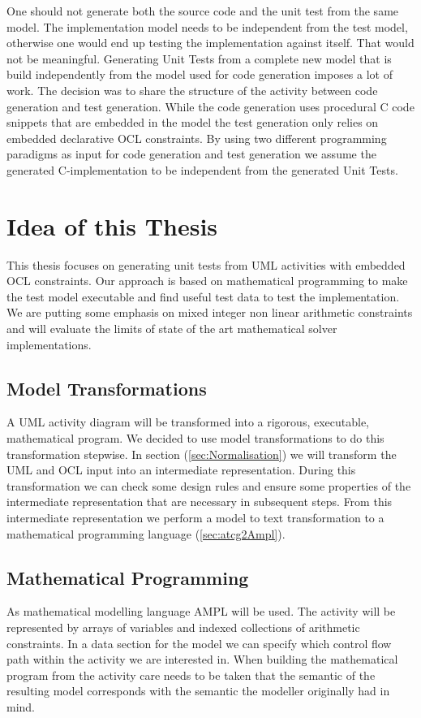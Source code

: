 One should not generate both the source code and the unit test from the same model. The implementation model needs to be independent from the test model, otherwise one would end up testing the implementation against itself. That would not be meaningful. %
Generating Unit Tests from a complete new model that is build independently from the model used for code generation imposes a lot of work. The decision was to share the structure of the activity between code generation and test generation. While the code generation uses procedural C code snippets that are embedded in the model the test generation only relies on embedded declarative OCL constraints. By using two different programming paradigms as input for code generation and test generation we assume the generated C-implementation to be independent from the generated Unit Tests.


\section{Idea of this Thesis}
This thesis focuses on generating unit tests from UML activities with embedded OCL constraints. Our approach is based on mathematical programming to make the test model executable and find useful test data to test the implementation. We are putting some emphasis on mixed integer non linear arithmetic constraints and will evaluate the limits of state of the art mathematical solver implementations.
\subsection{Model Transformations}
A UML activity diagram will be transformed into a rigorous, executable, mathematical program. We decided to use model transformations to do this transformation stepwise. In section (\ref{sec:Normalisation}) we will transform the UML and OCL input into an intermediate representation. During this transformation we can check some design rules and ensure some properties of the intermediate representation that are necessary in subsequent steps. From this intermediate representation we perform a model to text transformation to a mathematical programming language (\ref{sec:atcg2Ampl}).
\subsection{Mathematical Programming}
As mathematical modelling language AMPL will be used. The activity will be represented by arrays of variables and indexed collections of arithmetic constraints. In a data section for the model we can specify which control flow path within the activity we are interested in. When building the mathematical program from the activity care needs to be taken that the semantic of the resulting model corresponds with the semantic the modeller originally had in mind.
